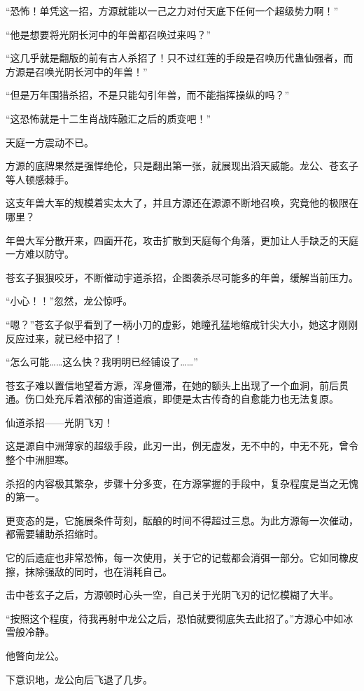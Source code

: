 \begin{this_body}
“恐怖！单凭这一招，方源就能以一己之力对付天底下任何一个超级势力啊！”

“他是想要将光阴长河中的年兽都召唤过来吗？”

“这几乎就是翻版的前有古人杀招了！只不过红莲的手段是召唤历代蛊仙强者，而方源是召唤光阴长河中的年兽！”

“但是万年围猎杀招，不是只能勾引年兽，而不能指挥操纵的吗？”

“这恐怖就是十二生肖战阵融汇之后的质变吧！”

天庭一方震动不已。

方源的底牌果然是强悍绝伦，只是翻出第一张，就展现出滔天威能。龙公、苍玄子等人顿感棘手。

这支年兽大军的规模着实太大了，并且方源还在源源不断地召唤，究竟他的极限在哪里？

年兽大军分散开来，四面开花，攻击扩散到天庭每个角落，更加让人手缺乏的天庭一方难以防守。

苍玄子狠狠咬牙，不断催动宇道杀招，企图袭杀尽可能多的年兽，缓解当前压力。

“小心！！”忽然，龙公惊呼。

“嗯？”苍玄子似乎看到了一柄小刀的虚影，她瞳孔猛地缩成针尖大小，她这才刚刚反应过来，就已经中招了！

“怎么可能……这么快？我明明已经铺设了……”

苍玄子难以置信地望着方源，浑身僵滞，在她的额头上出现了一个血洞，前后贯通。伤口处充斥着浓郁的宙道道痕，即便是太古传奇的自愈能力也无法复原。

仙道杀招——光阴飞刃！

这是源自中洲薄家的超级手段，此刃一出，例无虚发，无不中的，中无不死，曾令整个中洲胆寒。

杀招的内容极其繁杂，步骤十分多变，在方源掌握的手段中，复杂程度是当之无愧的第一。

更变态的是，它施展条件苛刻，酝酿的时间不得超过三息。为此方源每一次催动，都需要辅助杀招缩时。

它的后遗症也非常恐怖，每一次使用，关于它的记载都会消弭一部分。它如同橡皮擦，抹除强敌的同时，也在消耗自己。

击中苍玄子之后，方源顿时心头一空，自己关于光阴飞刃的记忆模糊了大半。

“按照这个程度，待我再射中龙公之后，恐怕就要彻底失去此招了。”方源心中如冰雪般冷静。

他瞥向龙公。

下意识地，龙公向后飞退了几步。


\end{this_body}
